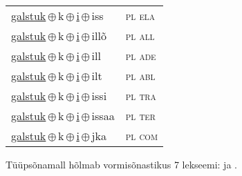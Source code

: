 \begin{minipage}{\textwidth}
\begin{sideways}
\begin{tabular}{l l}
\underline{galstuk}\,$\oplus$\,k\,$\oplus$\,\underline{i}\,$\oplus$\,iss & \textsc{ pl ela } \\
\underline{galstuk}\,$\oplus$\,k\,$\oplus$\,\underline{i}\,$\oplus$\,illõ & \textsc{ pl all } \\
\underline{galstuk}\,$\oplus$\,k\,$\oplus$\,\underline{i}\,$\oplus$\,ill & \textsc{ pl ade } \\
\underline{galstuk}\,$\oplus$\,k\,$\oplus$\,\underline{i}\,$\oplus$\,ilt & \textsc{ pl abl } \\
\underline{galstuk}\,$\oplus$\,k\,$\oplus$\,\underline{i}\,$\oplus$\,issi & \textsc{ pl tra } \\
\underline{galstuk}\,$\oplus$\,k\,$\oplus$\,\underline{i}\,$\oplus$\,issaa & \textsc{ pl ter } \\
\underline{galstuk}\,$\oplus$\,k\,$\oplus$\,\underline{i}\,$\oplus$\,jka & \textsc{ pl com } \\
\end{tabular}
\end{sideways}
\label{tab:tüüpsõnamall-galstukki}

\end{minipage}

 
\vspace{1em}
\noindent Tüüpsõnamall  hõlmab vormisõnastikus 7 lekseemi:  ja .
